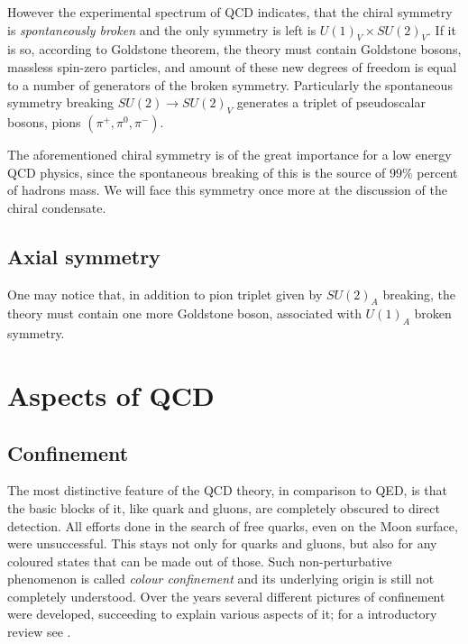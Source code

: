 	
	However the experimental spectrum of QCD indicates, that the chiral symmetry is \textit{spontaneously broken} and the only symmetry is left is $U(1)_V \times SU(2)_V$. If it is so, according to Goldstone theorem, the theory must contain Goldstone bosons, massless spin-zero particles, and amount of these new degrees of freedom is equal to a number of generators of the broken symmetry. Particularly the spontaneous symmetry breaking $SU(2) \rightarrow SU(2)_V$ generates a triplet of pseudoscalar bosons, pions $(\pi^+, \pi^0, \pi^-)$. 
	
	The aforementioned chiral symmetry is of the great importance for a low energy QCD physics, since the spontaneous breaking of this is the source of $99\%$ percent of hadrons mass. We will face this symmetry once more at the discussion of the chiral condensate.
	\subsection*{Axial symmetry}
	One may notice that, in addition to pion triplet given by $SU(2)_A$ breaking, the theory must contain one more Goldstone boson, associated with $U(1)_A$ broken symmetry. 
\section{Aspects of QCD}
	\subsection*{Confinement}
The most distinctive feature of the QCD theory, in comparison to QED, is that the basic blocks of it, like quark and gluons, are completely obscured to direct detection. All efforts done in the search of free quarks, even on the Moon surface, were unsuccessful. This stays not only for quarks and gluons, but also for any coloured states that can be made out of those. Such non-perturbative phenomenon is called \textit{colour confinement} and its  underlying origin is still not completely understood. Over the years several different pictures of confinement were developed, succeeding to explain various aspects of it; for a introductory review see \cite{Greensite201101}. 

